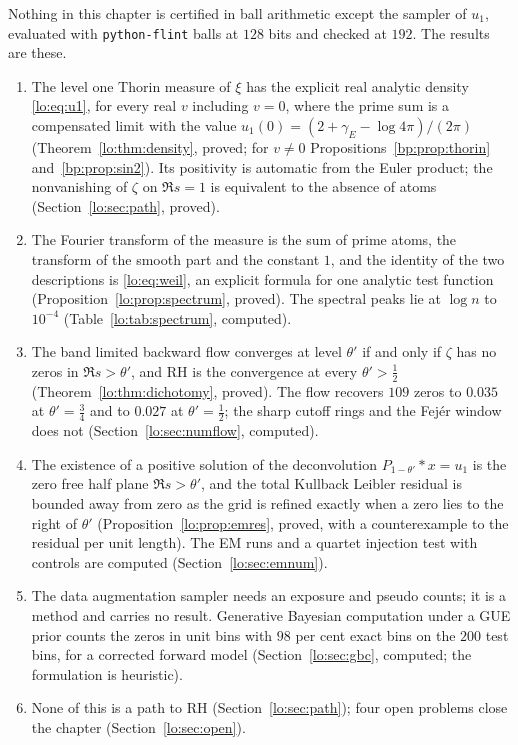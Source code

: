 Nothing in this chapter is certified in ball arithmetic except the sampler of $u_1$, evaluated with \texttt{python-flint} balls at $128$ bits and checked at $192$. The results are these.
\begin{enumerate}
\item The level one Thorin measure of $\xi$ has the explicit real analytic density \eqref{lo:eq:u1}, for every real $v$ including $v=0$, where the prime sum is a compensated limit with the value $u_1(0)=(2+\gamma_E-\log4\pi)/(2\pi)$ (Theorem~\ref{lo:thm:density}, proved; for $v\ne0$ Propositions~\ref{bp:prop:thorin} and~\ref{bp:prop:sin2}). Its positivity is automatic from the Euler product; the nonvanishing of $\zeta$ on $\Re s=1$ is equivalent to the absence of atoms (Section~\ref{lo:sec:path}, proved).
\item The Fourier transform of the measure is the sum of prime atoms, the transform of the smooth part and the constant $1$, and the identity of the two descriptions is \eqref{lo:eq:weil}, an explicit formula for one analytic test function (Proposition~\ref{lo:prop:spectrum}, proved). The spectral peaks lie at $\log n$ to $10^{-4}$ (Table~\ref{lo:tab:spectrum}, computed).
\item The band limited backward flow converges at level $\theta'$ if and only if $\zeta$ has no zeros in $\Re s>\theta'$, and RH is the convergence at every $\theta'>\tfrac12$ (Theorem~\ref{lo:thm:dichotomy}, proved). The flow recovers $109$ zeros to $0.035$ at $\theta'=\tfrac34$ and to $0.027$ at $\theta'=\tfrac12$; the sharp cutoff rings and the Fej\'er window does not (Section~\ref{lo:sec:numflow}, computed).
\item The existence of a positive solution of the deconvolution $P_{1-\theta'}*x=u_1$ is the zero free half plane $\Re s>\theta'$, and the total Kullback Leibler residual is bounded away from zero as the grid is refined exactly when a zero lies to the right of $\theta'$ (Proposition~\ref{lo:prop:emres}, proved, with a counterexample to the residual per unit length). The EM runs and a quartet injection test with controls are computed (Section~\ref{lo:sec:emnum}).
\item The data augmentation sampler needs an exposure and pseudo counts; it is a method and carries no result. Generative Bayesian computation under a GUE prior counts the zeros in unit bins with $98$ per cent exact bins on the $200$ test bins, for a corrected forward model (Section~\ref{lo:sec:gbc}, computed; the formulation is heuristic).
\item None of this is a path to RH (Section~\ref{lo:sec:path}); four open problems close the chapter (Section~\ref{lo:sec:open}).
\end{enumerate}
